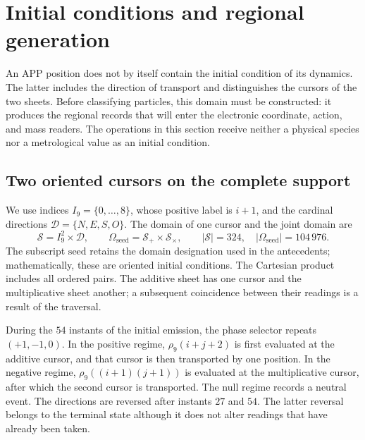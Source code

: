 \section{Initial conditions and regional generation}
\label{vi:vi:reg:seccion}\label{vi:sec:extension}\label{vi:sec:generacion}

An APP position does not by itself contain the initial condition of its
dynamics. The latter includes the direction of transport and distinguishes the cursors
of the two sheets. Before classifying particles, this domain must be
constructed: it produces the regional records that
will enter the electronic coordinate, action, and mass
readers. The operations in this section receive neither a physical species nor
a metrological value as an initial condition.

\subsection{Two oriented cursors on the complete support}

We use indices \(I_9=\{0,\ldots,8\}\), whose positive label is
\(i+1\), and the cardinal directions \(\mathcal D=\{N,E,S,O\}\).
The domain of one cursor and the joint domain are
\begin{equation}
 \mathcal S=I_9^2\times\mathcal D,\qquad
 \Omega_{\mathrm{seed}}=\mathcal S_+\times\mathcal S_\times,
 \qquad |\mathcal S|=324,\quad
 |\Omega_{\mathrm{seed}}|=104\,976.
 \label{vi:eq:semillas}
\end{equation}
The subscript \(\mathrm{seed}\) retains the domain designation used in
the antecedents; mathematically, these are oriented initial
conditions. The Cartesian product includes all ordered pairs.
The additive sheet has one cursor and the multiplicative sheet another; a
subsequent coincidence between their readings is a result of the traversal.

During the \(54\) instants of the initial emission, the phase selector
repeats \((+1,-1,0)\). In the positive regime,
\(\rho_9(i+j+2)\) is first evaluated at the additive cursor, and that
cursor is then transported by one position. In the negative regime,
\(\rho_9((i+1)(j+1))\) is evaluated at the multiplicative cursor, after which
the second cursor is transported. The null regime records a neutral event. The
directions are reversed after instants \(27\) and \(54\).
The latter reversal belongs to the terminal state although it does not alter
readings that have already been taken.

